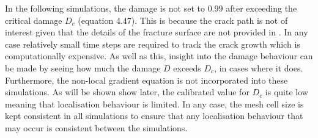 \documentclass[sn-mathphys,Numbered,draft]{sn-jnl}%
\begin{document}





In the following simulations, the damage is not set to $0.99$ after exceeding the critical damage $D_c$ (equation 4.47). This is because the crack path is not of interest given that the details of the fracture surface are not provided in \citet{roh_process_2021}. In any case relatively small time steps are required to track the crack growth which is computationally expensive. As well as this, insight into the damage behaviour can be made by seeing how much the damage $D$ exceeds $D_c$, in cases where it does. Furthermore, the non-local gradient equation is not incorporated into these simulations. As will be shown show later, the calibrated value for $D_c$ is quite low meaning that localisation behaviour is limited. In any case, the mesh cell size is kept consistent in all simulations to ensure that any localisation behaviour that may occur is consistent between the simulations. 
\end{document}
